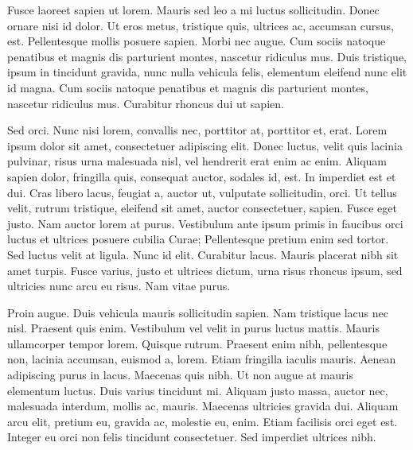 Fusce laoreet sapien ut lorem. Mauris sed leo a mi luctus sollicitudin.
Donec ornare nisi id dolor. Ut eros metus, tristique quis, ultrices ac,
accumsan cursus, est. Pellentesque mollis posuere sapien. Morbi nec augue.
Cum sociis natoque penatibus et magnis dis parturient montes, nascetur
ridiculus mus. Duis tristique, ipsum in tincidunt gravida, nunc nulla
vehicula felis, elementum eleifend nunc elit id magna. Cum sociis natoque
penatibus et magnis dis parturient montes, nascetur ridiculus mus. Curabitur
rhoncus dui ut sapien.

Sed orci. Nunc nisi lorem, convallis nec, porttitor at, porttitor et, erat.
Lorem ipsum dolor sit amet, consectetuer adipiscing elit. Donec luctus, velit
quis lacinia pulvinar, risus urna malesuada nisl, vel hendrerit erat enim ac
enim. Aliquam sapien dolor, fringilla quis, consequat auctor, sodales id,
est. In imperdiet est et dui. Cras libero lacus, feugiat a, auctor ut,
vulputate sollicitudin, orci. Ut tellus velit, rutrum tristique, eleifend sit
amet, auctor consectetuer, sapien. Fusce eget justo. Nam auctor lorem at
purus. Vestibulum ante ipsum primis in faucibus orci luctus et ultrices
posuere cubilia Curae; Pellentesque pretium enim sed tortor. Sed luctus velit
at ligula. Nunc id elit. Curabitur lacus. Mauris placerat nibh sit amet
turpis. Fusce varius, justo et ultrices dictum, urna risus rhoncus ipsum, sed
ultricies nunc arcu eu risus. Nam vitae purus.

Proin augue. Duis vehicula mauris sollicitudin sapien. Nam tristique lacus
nec nisl. Praesent quis enim. Vestibulum vel velit in purus luctus mattis.
Mauris ullamcorper tempor lorem. Quisque rutrum. Praesent enim nibh,
pellentesque non, lacinia accumsan, euismod a, lorem. Etiam fringilla
iaculis mauris. Aenean adipiscing purus in lacus. Maecenas quis nibh. Ut
non augue at mauris elementum luctus. Duis varius tincidunt mi. Aliquam
justo massa, auctor nec, malesuada interdum, mollis ac, mauris. Maecenas
ultricies gravida dui. Aliquam arcu elit, pretium eu, gravida ac, molestie
eu, enim. Etiam facilisis orci eget est. Integer eu orci non felis tincidunt
consectetuer. Sed imperdiet ultrices nibh.